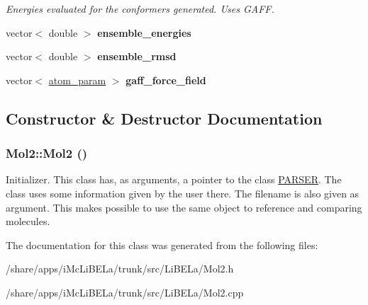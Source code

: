 \begin{DoxyCompactItemize}
\begin{DoxyCompactList}\small\item\em Energies evaluated for the conformers generated. Uses GAFF. \item\end{DoxyCompactList}\item 
\hypertarget{classMol2_af1d8d0fc093877e7d44a6d706c1e58f5}{
vector$<$ double $>$ {\bfseries ensemble\_\-energies}}
\label{classMol2_af1d8d0fc093877e7d44a6d706c1e58f5}

\item 
\hypertarget{classMol2_ae421fa0138847be547a747098dd398bf}{
vector$<$ double $>$ {\bfseries ensemble\_\-rmsd}}
\label{classMol2_ae421fa0138847be547a747098dd398bf}

\item 
\hypertarget{classMol2_a5f26f2369bc424207c647333aa94120d}{
vector$<$ \hyperlink{structMol2_1_1atom__param}{atom\_\-param} $>$ {\bfseries gaff\_\-force\_\-field}}
\label{classMol2_a5f26f2369bc424207c647333aa94120d}

\end{DoxyCompactItemize}


\subsection{Constructor \& Destructor Documentation}
\hypertarget{classMol2_a418668977615fd445e59cb4a49e98787}{
\subsubsection[{Mol2}]{\setlength{\rightskip}{0pt plus 5cm}Mol2::Mol2 ()}}
\label{classMol2_a418668977615fd445e59cb4a49e98787}
Initializer. This class has, as arguments, a pointer to the class \hyperlink{classPARSER}{PARSER}. The class uses some information given by the user there. The filename is also given as argument. This makes possible to use the same object to reference and comparing molecules. 

The documentation for this class was generated from the following files:\begin{DoxyCompactItemize}
\item 
/share/apps/iMcLiBELa/trunk/src/LiBELa/Mol2.h\item 
/share/apps/iMcLiBELa/trunk/src/LiBELa/Mol2.cpp\end{DoxyCompactItemize}
